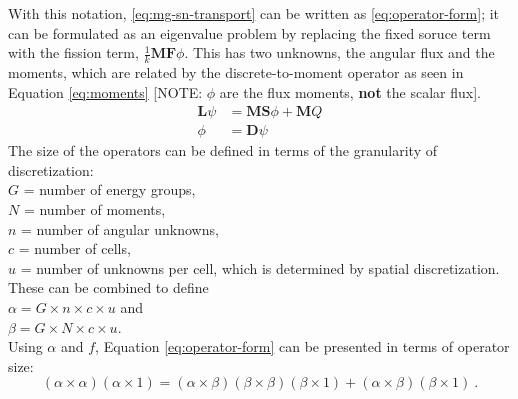 \documentclass[12pt]{article}
\newcommand{\ve}[1]{\ensuremath{\mathbf{#1}}}
\begin{document}
With this notation, \autoref{eq:mg-sn-transport} can be written as \autoref{eq:operator-form}; it can be formulated as an eigenvalue problem by replacing the fixed soruce term with the fission term, $\frac{1}{k}\mathbf{MF}\phi$. This has two unknowns, the angular flux and the moments, which are related by the discrete-to-moment operator as seen in Equation \eqref{eq:moments} [NOTE: $\phi$ are the flux moments, \textbf{not} the scalar flux].
%
\begin{align}
  \mathbf{L} \psi &= \mathbf{MS}\phi + \ve{M}Q \label{eq:operator-form}\\
  \phi &= \mathbf{D}\psi 
  \label{eq:moments}
\end{align}
%
The size of the operators can be defined in terms of the granularity of discretization: \\
%
\hspace*{2em} $G$ = number of energy groups, \\
\hspace*{2em} $N$ = number of moments, \\
\hspace*{2em} $n$ = number of angular unknowns, \\
\hspace*{2em} $c$ = number of cells, \\
\hspace*{2em} $u$ = number of unknowns per cell, which is determined by spatial discretization. \\
%
These can be combined to define \\
\hspace*{2em} $\alpha = G \times n \times c \times u$ and \\
\hspace*{2em} $\beta = G \times N \times c \times u$. \\
Using $\alpha$ and $f$, Equation \eqref{eq:operator-form} can be presented in terms of operator size:\\
\[
(\alpha \times \alpha)(\alpha \times 1) = (\alpha \times \beta) (\beta \times \beta) (\beta \times 1) + (\alpha \times \beta) (\beta \times 1)\:.
\]
\end{document}

